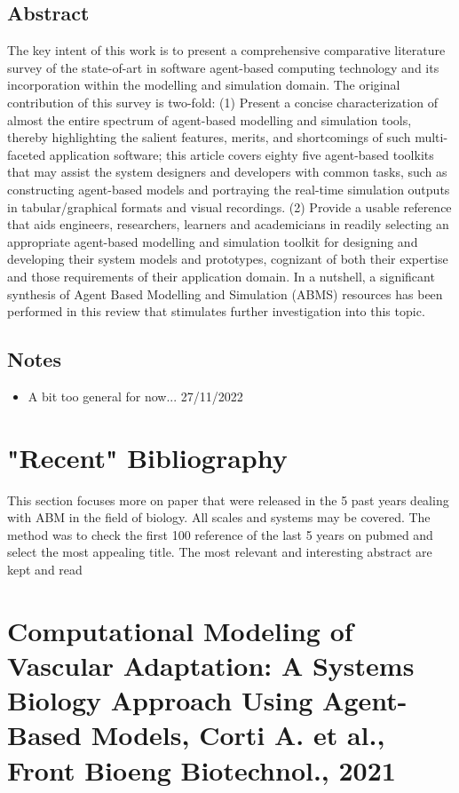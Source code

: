 \documentclass[11pt,a4paper]{article}
\begin{document}
\subsection*{Abstract}
The key intent of this work is to present a comprehensive comparative literature survey of the state-of-art in software agent-based computing technology and its incorporation within the modelling and simulation domain. The original contribution of this survey is two-fold: (1) Present a concise characterization of almost the entire spectrum of agent-based modelling and simulation tools, thereby highlighting the salient features, merits, and shortcomings of such multi-faceted application software; this article covers eighty five agent-based toolkits that may assist the system designers and developers with common tasks, such as constructing agent-based models and portraying the real-time simulation outputs in tabular/graphical formats and visual recordings. (2) Provide a usable reference that aids engineers, researchers, learners and academicians in readily selecting an appropriate agent-based modelling and simulation toolkit for designing and developing their system models and prototypes, cognizant of both their expertise and those requirements of their application domain. In a nutshell, a significant synthesis of Agent Based Modelling and Simulation (ABMS) resources has been performed in this review that stimulates further investigation into this topic.

\subsection*{Notes}
\begin{itemize}
\item A bit too general for now... 27/11/2022
\end{itemize}

\section{"Recent" Bibliography}
This section focuses more on paper that were released in the 5 past years dealing with ABM in the field of biology. All scales and systems may be covered. The method was to check the first 100 reference of the last 5 years on pubmed and select the most appealing title. The most relevant and interesting abstract are kept and read

\section*{Computational Modeling of Vascular Adaptation: A Systems Biology Approach Using Agent-Based Models, Corti A. et al., Front Bioeng Biotechnol., 2021}
\end{document}
